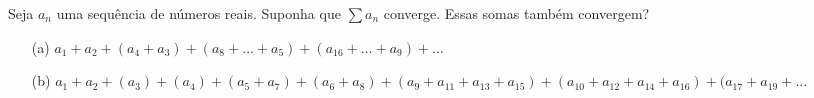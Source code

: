 Seja \(a_n\) uma sequência de números reais. Suponha que \(\sum a_n\) converge. Essas somas também convergem?
\begin{itemize}
\item[(a)] \(a_1+a_2+(a_4+a_3)+(a_8+\dots+a_5)+(a_{16}+\dots+a_9)+\dots\)
\item[(b)] \(a_1+a_2+(a_3)+(a_4)+(a_5+a_7)+(a_6+a_8)+(a_9+a_{11}+a_{13}+a_{15})+(a_{10}+a_{12}+a_{14}+a_{16})+(a_{17}+a_{19}+\dots\)
\end{itemize}
